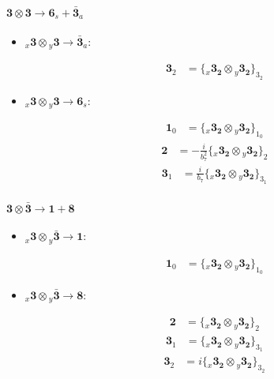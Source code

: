 \documentclass[english]{article}
\newcommand{\cgEqFontsize}{\large}
\newcommand{\rep}[1]{\mathbf{#1}}
\newcommand{\repx}[2]{{}_{#2}\mathbf{#1}}
\newcommand{\tsprod}[2]{\rep{#1}\otimes\rep{#2}}
\newcommand{\tsprodx}[2]{\repx{#1}{x}\otimes\repx{#2}{y}}
\newcommand{\subcgs}[3]{\big\{ \tsprodx{#1}{#2}\big\}^{}_{#3}}
\begin{document}
\paragraph*{\cgEqFontsize $\tsprod{3}{3}\to\rep{6}_s+\rep{\bar{3}}_a$}
\begin{itemize}
\item $\tsprodx{3}{3}\to\rep{\bar{3}}_{a}$:
\begin{fleqn}
\begin{align*}
\rep{3}_{2} & = \subcgs{3_{2}}{3_{2}}{3_{2}}
\end{align*}
\end{fleqn}
\item $\tsprodx{3}{3}\to\rep{6}_{s}$:
\begin{fleqn}
\begin{align*}
\rep{1}_{0} & = \subcgs{3_{2}}{3_{2}}{1_{0}}
\end{align*}
\begin{align*}
\rep{2} & = -\frac{i}{b_7^2}\subcgs{3_{2}}{3_{2}}{2}
\end{align*}
\begin{align*}
\rep{3}_{1} & = \frac{i}{b_7}\subcgs{3_{2}}{3_{2}}{3_{1}}
\end{align*}
\end{fleqn}
\end{itemize}
\paragraph*{\cgEqFontsize $\tsprod{3}{\bar{3}}\to\rep{1}+\rep{8}$}
\begin{itemize}
\item $\tsprodx{3}{\bar{3}}\to\rep{1}$:
\begin{fleqn}
\begin{align*}
\rep{1}_{0} & = \subcgs{3_{2}}{3_{2}}{1_{0}}
\end{align*}
\end{fleqn}
\item $\tsprodx{3}{\bar{3}}\to\rep{8}$:
\begin{fleqn}
\begin{align*}
\rep{2} & = \subcgs{3_{2}}{3_{2}}{2}
\end{align*}
\begin{align*}
\rep{3}_{1} & = \subcgs{3_{2}}{3_{2}}{3_{1}}
\end{align*}
\begin{align*}
\rep{3}_{2} & = i\subcgs{3_{2}}{3_{2}}{3_{2}}
\end{align*}
\end{fleqn}
\end{itemize}
\end{document}
